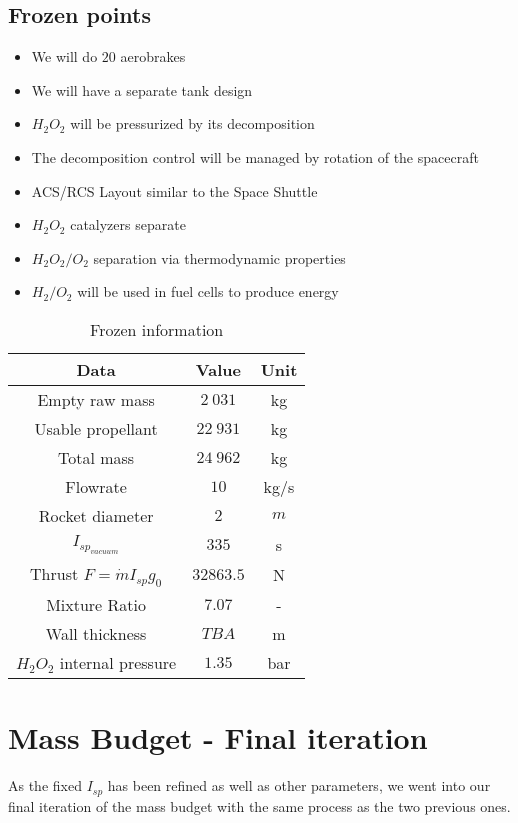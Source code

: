 \subsection{Frozen points}
\begin{itemize}
\item We will do $20$ aerobrakes
\item We will have a separate tank design
\item $H_2O_2$ will be pressurized by its decomposition
\item The decomposition control will be managed by rotation of the spacecraft
\item ACS/RCS Layout similar to the Space Shuttle
\item $H_2O_2$ catalyzers separate
\item $H_2O_2/O_2$ separation via thermodynamic properties
\item $H_2/O_2$ will be used in fuel cells to produce energy
\end{itemize}
\begin{center}
\begin{table}

\begin{tabular}[H]{|c|c|c|}
	\hline
	\cellcolor{gray!50}Data & \cellcolor{gray!50}Value & \cellcolor{gray!50}Unit\\
	\hline
	Empty raw mass & $2\ 031$ & kg\\
	\hline
	Usable propellant & $22\ 931$ &kg\\
	\hline
	\cellcolor{green!50}Total mass & \cellcolor{green!50}$24\ 962$ & \cellcolor{green!50}kg\\
	\hline
	Flowrate & $10$ & kg/s\\
	\hline
	Rocket diameter & $2$ & $m$\\
	\hline
	$I_{sp_{vacuum}}$ & $335$ & s\\
	\hline
	Thrust $F=\dot m I_{sp} g_0$ & $32 863.5$ &N\\
	\hline
	Mixture Ratio & $7.07$ & -\\
	\hline
	Wall thickness & $TBA$ & m\\
	\hline
	$H_2O_2$ internal pressure & $1.35$ & bar\\
	\hline
\end{tabular}
\caption{Frozen information}
\end{table}
\end{center}
\newpage
\section{Mass Budget - Final iteration}
As the fixed $I_{sp}$ has been refined as well as other parameters, we went into our final iteration of the mass budget with the same process as the two previous ones.
